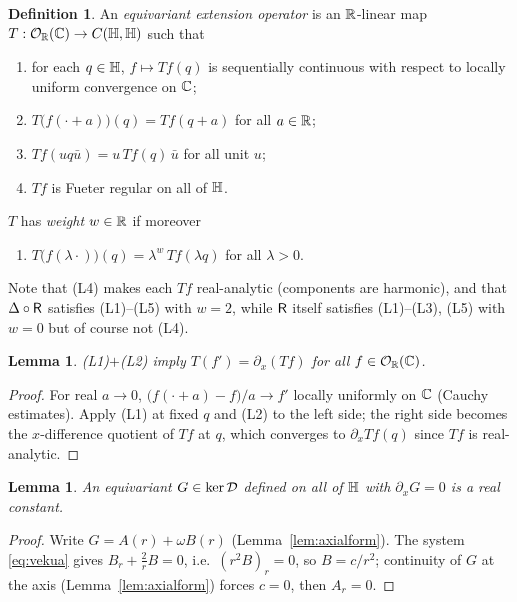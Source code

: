 \documentclass[11pt]{amsart}
\newtheorem{lemma}[theorem]{Lemma}
\theoremstyle{definition}
\newtheorem{definition}[theorem]{Definition}
\theoremstyle{remark}
\begin{document}
\begin{definition}\label{def:extop}
An \emph{equivariant extension operator} is an $\mathbb{R}$-linear map
$T:\mathcal{O}_{\mathbb{R}}(\mathbb{C})\to C(\mathbb{H},\mathbb{H})$ such that
\begin{enumerate}
\item[\textup{(L1)}] for each $q\in\mathbb{H}$, $f\mapsto Tf(q)$ is sequentially
continuous with respect to locally uniform convergence on $\mathbb{C}$;
\item[\textup{(L2)}] $T\bigl(f(\cdot+a)\bigr)(q)=Tf(q+a)$ for all
$a\in\mathbb{R}$;
\item[\textup{(L3)}] $Tf(uq\bar u)=u\,Tf(q)\,\bar u$ for all unit $u$;
\item[\textup{(L4)}] $Tf$ is Fueter regular on all of $\mathbb{H}$.
\end{enumerate}
$T$ has \emph{weight} $w\in\mathbb{R}$ if moreover
\begin{enumerate}
\item[\textup{(L5)}] $T\bigl(f(\lambda\cdot)\bigr)(q)
=\lambda^{w}\,Tf(\lambda q)$ for all $\lambda>0$.
\end{enumerate}
\end{definition}

Note that (L4) makes each $Tf$ real-analytic (components are harmonic),
and that $\Delta\circ\mathsf{R}$ satisfies (L1)--(L5) with $w=2$, while
$\mathsf{R}$ itself satisfies (L1)--(L3), (L5) with $w=0$ but of course not
(L4).

\begin{lemma}\label{lem:derivative}
\textup{(L1)}$+$\textup{(L2)} imply $T(f')=\partial_x(Tf)$ for all
$f\in\mathcal{O}_{\mathbb{R}}(\mathbb{C})$.
\end{lemma}

\begin{proof}
For real $a\to0$, $\bigl(f(\cdot+a)-f\bigr)/a\to f'$ locally uniformly on
$\mathbb{C}$ (Cauchy estimates).  Apply (L1) at fixed $q$ and (L2) to the left
side; the right side becomes the $x$-difference quotient of $Tf$ at $q$,
which converges to $\partial_xTf(q)$ since $Tf$ is real-analytic.
\end{proof}

\begin{lemma}\label{lem:xindep}
An equivariant $G\in\ker\mathcal{D}$ defined on all of $\mathbb{H}$ with
$\partial_xG=0$ is a real constant.
\end{lemma}

\begin{proof}
Write $G=A(r)+\omega B(r)$ (Lemma~\ref{lem:axialform}).  The system
\eqref{eq:vekua} gives $B_r+\tfrac2rB=0$, i.e.\ $(r^2B)_r=0$, so
$B=c/r^2$; continuity of $G$ at the axis (Lemma~\ref{lem:axialform})
forces $c=0$, then $A_r=0$.
\end{proof}
\end{document}
